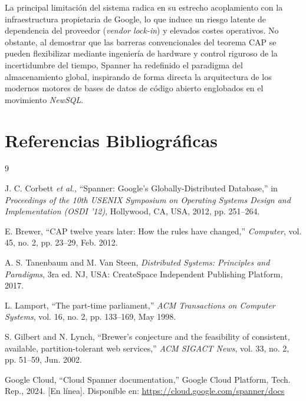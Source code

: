 \documentclass[11pt,a4paper]{article}
\begin{document}
La principal limitación del sistema radica en su estrecho acoplamiento con la infraestructura propietaria de Google, lo que induce un riesgo latente de dependencia del proveedor (\textit{vendor lock-in}) y elevados costes operativos. No obstante, al demostrar que las barreras convencionales del teorema CAP se pueden flexibilizar mediante ingeniería de hardware y control riguroso de la incertidumbre del tiempo, Spanner ha redefinido el paradigma del almacenamiento global, inspirando de forma directa la arquitectura de los modernos motores de bases de datos de código abierto englobados en el movimiento \textit{NewSQL}.

\newpage
\section*{Referencias Bibliográficas}
\begin{thebibliography}{9}

J. C. Corbett \textit{et al.}, ``Spanner: Google's Globally-Distributed Database,'' in \textit{Proceedings of the 10th USENIX Symposium on Operating Systems Design and Implementation (OSDI '12)}, Hollywood, CA, USA, 2012, pp. 251--264.

E. Brewer, ``CAP twelve years later: How the rules have changed,'' \textit{Computer}, vol. 45, no. 2, pp. 23--29, Feb. 2012.

A. S. Tanenbaum and M. Van Steen, \textit{Distributed Systems: Principles and Paradigms}, 3ra ed. NJ, USA: CreateSpace Independent Publishing Platform, 2017.

L. Lamport, ``The part-time parliament,'' \textit{ACM Transactions on Computer Systems}, vol. 16, no. 2, pp. 133--169, May 1998.

S. Gilbert and N. Lynch, ``Brewer's conjecture and the feasibility of consistent, available, partition-tolerant web services,'' \textit{ACM SIGACT News}, vol. 33, no. 2, pp. 51--59, Jun. 2002.

Google Cloud, ``Cloud Spanner documentation,'' Google Cloud Platform, Tech. Rep., 2024. [En línea]. Disponible en: \url{https://cloud.google.com/spanner/docs}

\end{thebibliography}
\end{document}
